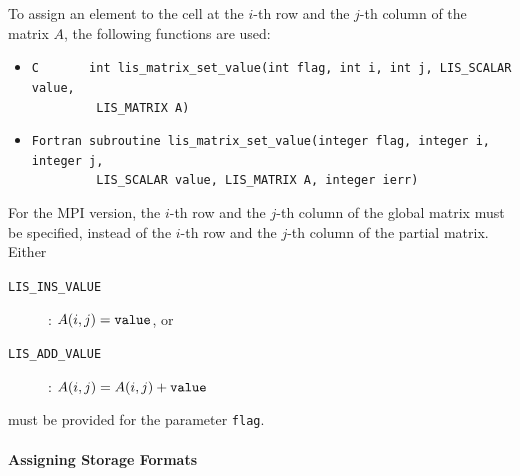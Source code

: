 \documentclass[a4paper]{article}
\begin{document}
To assign an element to the cell at the $i$-th row and the $j$-th column of
the matrix $A$, 
the following functions are used: 
\begin{itemize}
\item \verb|C       int lis_matrix_set_value(int flag, int i, int j, LIS_SCALAR value,|\\
      \verb|         LIS_MATRIX A)|
\item \verb|Fortran subroutine lis_matrix_set_value(integer flag, integer i, integer j,|\\
      \verb|         LIS_SCALAR value, LIS_MATRIX A, integer ierr)|
\end{itemize}
For the MPI version, the $i$-th row and the $j$-th column of the global matrix 
must be specified, instead of the $i$-th row and the $j$-th column of the partial matrix.
Either
\begin{description}
\item[\tt LIS\_INS\_VALUE]: $A(i,j) = {\tt value}$, or
\item[\tt LIS\_ADD\_VALUE]: $A(i,j) = A(i,j) + {\tt value}$
\end{description}
must be provided for the parameter \verb+flag+.
\\ \\
\noindent
{\bf Assigning Storage Formats}
\end{document}
